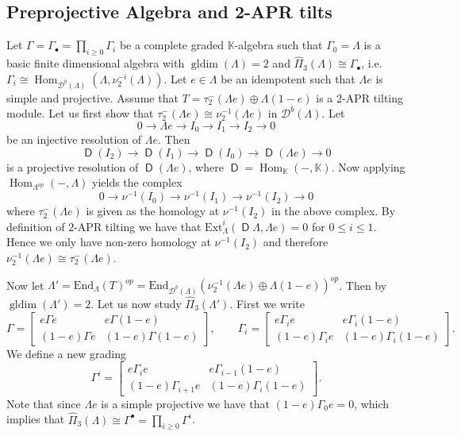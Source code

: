 \documentclass[a4paper, reqno]{amsart}
\theoremstyle{definition}
\newcommand{\K}{\mathbb{K}}
\DeclareMathOperator{\Hom}{\mathrm{Hom}}
\DeclareMathOperator{\gldim}{\mathrm{gldim}}
\DeclareMathOperator{\DD}{\mathsf{D}}
\begin{document}
\subsection{Preprojective Algebra and 2-APR tilts}
Let $\Gamma = \Gamma_\bullet = \prod_{i\ge 0} \Gamma_i$ be a complete graded $\K$-algebra such that $\Gamma_0 = \Lambda$ is a basic finite dimensional algebra with $\gldim(\Lambda) = 2$ and $\widehat{\Pi}_3(\Lambda) \cong \Gamma_\bullet$, i.e. $\Gamma_i \cong \Hom_{\mathcal{D}^b(\Lambda)}(\Lambda, \nu_2^{-i}(\Lambda))$. Let $e\in \Lambda$ be an idempotent such that $\Lambda e$ is simple and projective. Assume that $T = \tau_2^-(\Lambda e)\oplus \Lambda(1- e)$ is a $2$-APR tilting module. Let us first show that $\tau_2^-(\Lambda e)\cong \nu_2^{-1}(\Lambda e)$ in $\mathcal{D}^b(\Lambda)$. Let
\begin{equation*}
	0\to \Lambda e\to I_0\to I_1\to I_2 \to 0
\end{equation*}
be an injective resolution of $\Lambda e$. Then
\begin{equation*}
	\DD(I_2)\to \DD(I_{1}) \to \DD(I_0)\to \DD(\Lambda e)\to 0
\end{equation*}
is a projective resolution of $\DD(\Lambda e)$, where $\DD = \Hom_\K(-, \K)$. Now applying $\Hom_{\Lambda^{op}}(-, \Lambda)$ yields the complex
\begin{equation*}
	0\to \nu^{-1}(I_0)\to \nu^{-1}(I_1)\to \nu^{-1}(I_2)\to 0
\end{equation*}
where $\tau_2^-(\Lambda e)$ is given as the homology at $\nu^{-1}(I_2)$ in the above complex. By definition of $2$-APR tilting we have that $\mathrm{Ext}_\Lambda^i(\DD\Lambda, \Lambda e) = 0$ for $0\le i\le 1$. Hence we only have non-zero homology at $\nu^{-1}(I_2)$ and therefore $\nu_2^{-1}(\Lambda e)\cong \tau_2^-(\Lambda e)$.

Now let $\Lambda' = \mathrm{End}_\Lambda(T)^{op} = \mathrm{End}_{\mathcal{D}^b(\Lambda)}(\nu_2^{-1}(\Lambda e)\oplus \Lambda(1-e))^{op}$. Then by \cite[Proposition 3.6]{IO11nRFalgandnAPRtilt} $\gldim(\Lambda') = 2$. Let us now study $\widehat{\Pi}_3(\Lambda')$. First we write
\begin{equation*}
	\Gamma = \begin{bmatrix}
		e\Gamma e & e\Gamma (1-e) \\
		(1- e)\Gamma e & (1- e)\Gamma (1-e)
	\end{bmatrix}, \qquad \Gamma_i = \begin{bmatrix}
		e\Gamma_i e & e\Gamma_i (1-e) \\
		(1- e)\Gamma_i e & (1- e)\Gamma_i (1-e)
	\end{bmatrix}.
\end{equation*}
We define a new grading
\begin{equation*}
	\Gamma^i = \begin{bmatrix}
		e\Gamma_i e & e\Gamma_{i-1} (1-e) \\
		(1- e)\Gamma_{i+1} e & (1- e)\Gamma_i (1-e)
	\end{bmatrix}.
\end{equation*}
Note that since $\Lambda e$ is a simple projective we have that $(1- e)\Gamma_0 e = 0$, which implies that $\widehat{\Pi}_3(\Lambda)\cong \Gamma^\bullet = \prod_{i\ge 0}\Gamma^i$.
\end{document}
